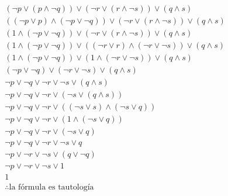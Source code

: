 \documentclass[11pt,letterpaper]{article}
\begin{document}
\begin{enumerate}
\begin{equation}
\begin{split}
\begin{aligned}
            (\neg p \lor (p \land \neg q)) \lor (\neg r \lor (r \land \neg s)) \lor (q \land s) \\
            ((\neg p \lor p) \land (\neg p \lor \neg q)) \lor (\neg r \lor (r \land \neg s)) \lor (q \land s) \\
            (1 \land (\neg p \lor \neg q)) \lor (\neg r \lor (r \land \neg s)) \lor (q \land s) \\
            (1 \land (\neg p \lor \neg q)) \lor ((\neg r \lor r) \land (\neg r \lor \neg s)) \lor (q \land s) \\
            (1 \land (\neg p \lor \neg q)) \lor (1 \land (\neg r \lor \neg s)) \lor (q \land s) \\
            (\neg p \lor \neg q) \lor (\neg r \lor \neg s) \lor (q \land s) \\
            \neg p \lor \neg q \lor \neg r \lor \neg s \lor (q \land s) \\
            \neg p \lor \neg q \lor \neg r \lor (\neg s \lor (q \land s)) \\
            \neg p \lor \neg q \lor \neg r \lor ((\neg s \lor s) \land(\neg s \lor q)) \\
            \neg p \lor \neg q \lor \neg r \lor (1 \land(\neg s \lor q)) \\
            \neg p \lor \neg q \lor \neg r \lor (\neg s \lor q) \\
            \neg p \lor \neg q \lor \neg r \lor \neg s \lor q \\
            \neg p \lor \neg r \lor \neg s \lor (q \lor \neg q) \\
            \neg p \lor \neg r \lor \neg s \lor 1 \\
            1 \\
            \therefore \text{la fórmula es tautología}
        \end{aligned}
        \end{split}
        \end{equation}
\end{enumerate}
\end{document}
